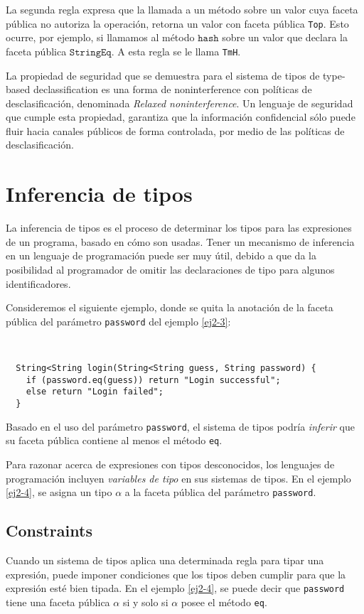 La segunda regla expresa que la llamada a un método sobre un valor cuya faceta pública no autoriza la operación, retorna un valor con faceta pública \texttt{Top}. Esto ocurre, por ejemplo, si llamamos al método $\mathtt{hash}$ sobre un valor que declara la faceta pública $\mathtt{StringEq}$. A esta regla se le llama \texttt{TmH}.

La propiedad de seguridad que se demuestra para el sistema de tipos de type-based declassification es una forma de noninterference con políticas de desclasificación, denominada \emph{Relaxed noninterference}. Un lenguaje de seguridad que cumple esta propiedad, garantiza que la información confidencial sólo puede fluir hacia canales públicos de forma controlada, por medio de las políticas de desclasificación.

\section{Inferencia de tipos}
La inferencia de tipos es el proceso de determinar los tipos para las expresiones de un programa, basado en cómo son usadas. Tener un mecanismo de inferencia en un lenguaje de programación puede ser muy útil, debido a que da la posibilidad al programador de omitir las declaraciones de tipo para algunos identificadores.

Consideremos el siguiente ejemplo, donde se quita la anotación de la faceta pública del parámetro \texttt{password} del ejemplo \ref{ej2-3}:

\begin{ej} \ \\
  \normalfont
  \label{ej2-4}
\begin{lstlisting}
  String<String login(String<String guess, String password) {
  	if (password.eq(guess)) return "Login successful";
  	else return "Login failed";
  }
\end{lstlisting}
\end{ej}

Basado en el uso del parámetro \texttt{password}, el sistema de tipos podría \emph{inferir} que su faceta pública contiene al menos el método \texttt{eq}.

Para razonar acerca de expresiones con tipos desconocidos, los lenguajes de programación incluyen \emph{variables de tipo} en sus sistemas de tipos. En el ejemplo \ref{ej2-4}, se asigna un tipo $\mathtt{\alpha}$ a la faceta pública del parámetro \texttt{password}.

\subsection{Constraints}
Cuando un sistema de tipos aplica una determinada regla para tipar una expresión, puede imponer condiciones que los tipos deben cumplir para que la expresión esté bien tipada. En el ejemplo \ref{ej2-4}, se puede decir que \texttt{password} tiene una faceta pública $\mathtt{\alpha}$ si y solo si $\mathtt{\alpha}$ posee el método \texttt{eq}.

